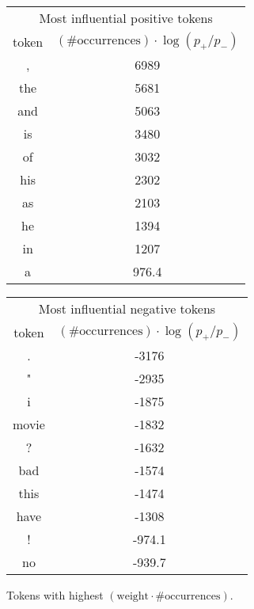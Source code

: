 \documentclass{article}
\begin{document}
\begin{figure}
\begin{tabular}{c|c}
    \multicolumn{2}{c}{Most influential positive tokens} \\
    token & \((\# \mathrm{occurrences}) \cdot \log(p_+ / p_-)\) \\
    \hline
     , & 6989 \\
    the & 5681 \\
    and & 5063 \\
    is & 3480 \\
    of & 3032 \\
    his & 2302 \\
    as & 2103 \\
    he & 1394 \\
    in & 1207 \\
    a & 976.4
\end{tabular}
\begin{tabular}{c|c}
    \multicolumn{2}{c}{Most influential negative tokens} \\
    token & \((\# \mathrm{occurrences}) \cdot \log(p_+ / p_-)\) \\
    \hline
    . & -3176 \\
    " & -2935 \\
    i & -1875 \\
    movie & -1832 \\
    ? & -1632 \\
    bad & -1574 \\
    this & -1474 \\
    have & -1308 \\
    ! & -974.1 \\
    no & -939.7
\end{tabular}
\caption{Tokens with highest \((\mathrm{weight} \cdot \# \mathrm{occurrences})\).}
\end{figure}
\end{document}
